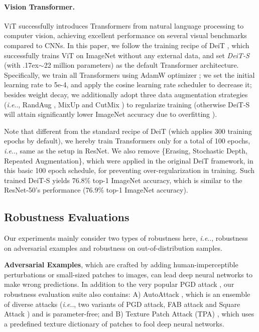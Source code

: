 \documentclass{article}
\makeatletter
\newcommand{\app}{\raise.17ex\hbox{$\scriptstyle\sim$}}
\DeclareRobustCommand\onedot{\futurelet\@let@token\@onedot}
\def\@onedot{\ifx\@let@token.\else.\null\fi\xspace}
\def\ie{\emph{i.e}\onedot} \def\Ie{\emph{I.e}\onedot}
\makeatother
\begin{document}
\paragraph{Vision Transformer.} 
ViT \cite{dosovitskiy2020image} successfully introduces Transformers from natural language processing to computer vision, achieving excellent performance on several visual benchmarks compared to CNNs. In this paper, we follow the training recipe of DeiT \cite{touvron2020training}, which successfully trains ViT on ImageNet without any external data, and set \emph{DeiT-S} (with \app22 million parameters) as the default Transformer architecture. Specifically, we train all Transformers using AdamW optimizer \cite{loshchilov2017decoupled}; we set the initial learning rate to 5e-4, and apply the cosine learning rate scheduler to decrease it; besides weight decay, we additionally adopt three data augmentation strategies (\ie, RandAug \cite{Cubuk2019}, MixUp \cite{Zhang2017a} and CutMix \cite{yun2019CutMix}) to regularize training (otherwise DeiT-S will attain significantly lower ImageNet accuracy due to overfitting \cite{chen2021vision}).

Note that different from the standard recipe of DeiT (which applies 300 training epochs by default), we hereby train Transformers only for a total of 100 epochs, \ie, same as the setup in ResNet. We also remove \{Erasing, Stochastic Depth, Repeated Augmentation\}, which were applied in the original DeiT framework, in this basic 100 epoch schedule, for preventing over-regularization in training. Such trained DeiT-S yields 76.8\% top-1 ImageNet accuracy, which is similar to the ResNet-50's performance (76.9\% top-1 ImageNet accuracy).

\subsection{Robustness Evaluations}
Our experiments mainly consider two types of robustness here, \ie,  robustness on adversarial examples and robustness on out-of-distribution samples. 

\textbf{Adversarial Examples}, which are crafted by adding human-imperceptible perturbations or small-sized patches to images, can lead deep neural networks to make wrong predictions. In addition to the very popular PGD attack \cite{Madry2018}, our robustness evaluation suite also contains: A) AutoAttack \cite{croce2020reliable}, which is an ensemble of diverse attacks (\ie, two variants of PGD attack, FAB attack \cite{croce2020minimally} and Square Attack \cite{andriushchenko2020square}) and is parameter-free; and B) Texture Patch Attack (TPA) \cite{yang2020patchattack}, which uses a predefined texture dictionary of patches to fool deep neural networks. 
\end{document}
